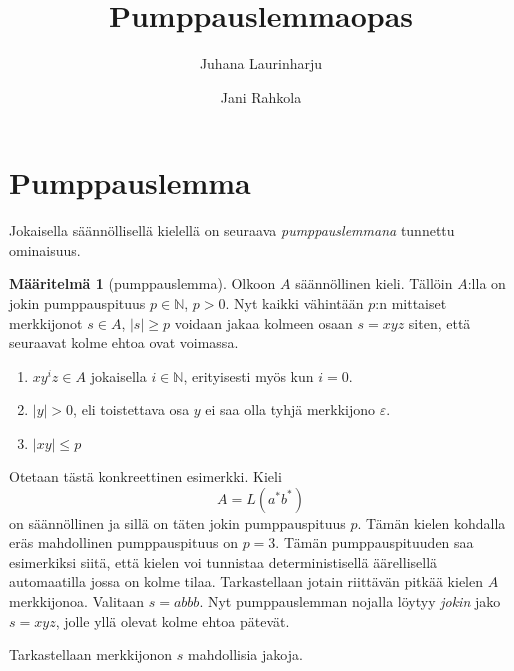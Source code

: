 \documentclass[a4paper,11pt]{article}
\title{Pumppauslemmaopas}
\author{Juhana Laurinharju \and Jani Rahkola}
\theoremstyle{definition}
\newtheorem*{definition}{Määritelmä}
\newcommand{\Nat}{\mathbb{N}}
\begin{document}
\belowdisplayskip=11pt
\abovedisplayskip=11pt
\belowdisplayshortskip=11pt
\abovedisplayshortskip=11pt

\maketitle

\section*{Pumppauslemma}

Jokaisella säännöllisellä kielellä on seuraava \emph{pumppauslemmana} tunnettu
ominaisuus.

\begin{definition}[pumppauslemma]
    Olkoon $A$ säännöllinen kieli. Tällöin $A$:lla on jokin
    pumppauspituus $p \in \Nat$, $p > 0$. Nyt kaikki vähintään $p$:n
    mittaiset merkkijonot $s \in A$, $|s| \geq p$ voidaan jakaa
    kolmeen osaan $s = xyz$ siten, että seuraavat kolme ehtoa ovat
    voimassa.

    \begin{enumerate}
        \item
          $xy^iz \in A$ jokaisella $i \in \Nat$, erityisesti myös kun
          $i = 0$.
        \item
          $|y| > 0$, eli toistettava osa $y$ ei saa olla tyhjä
          merkkijono $\varepsilon$.
        \item
          $|xy| \leq p$
    \end{enumerate}
\end{definition}

Otetaan tästä konkreettinen esimerkki. Kieli
\begin{equation*}
    A = L(a^*b^*)
\end{equation*}
on säännöllinen ja sillä on täten jokin pumppauspituus $p$. Tä\-män kielen
kohdalla eräs mahdollinen pumppauspituus on ${p = 3}$. Tämän pumppauspituuden
saa esimerkiksi siitä, että kielen voi tunnistaa deterministisellä äärellisellä
automaatilla jossa on kolme tilaa. Tarkastellaan jotain riittävän pitkää kielen
$A$ merkkijonoa. Valitaan ${s = abbb}$. Nyt pumppauslemman nojalla löytyy
\emph{jokin} jako ${s = xyz}$, jolle yllä olevat kolme ehtoa pätevät.

Tarkastellaan merkkijonon $s$ mahdollisia jakoja.
\end{document}
